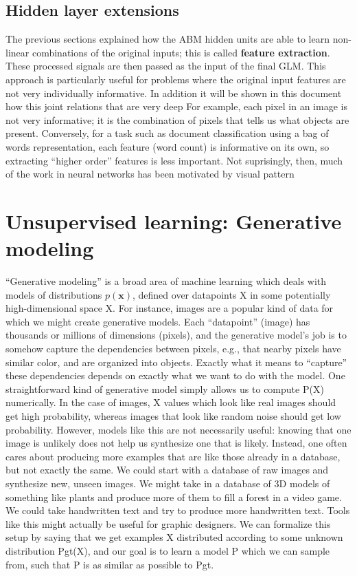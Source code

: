 \subsection{Hidden layer extensions}

The previous sections explained how the \ac{ABM} hidden units are able to learn non-linear combinations of the original inputs; this is called \textbf{feature extraction}. These processed signals are then passed as the input of the final \ac{GLM}. This approach is particularly useful for problems where the original input features are not very individually informative. 
In addition it will be shown in this document how this joint relations that are very deep 
For example, each pixel in an image is not very
informative; it is the combination of pixels that tells us what objects are present. Conversely, for
a task such as document classification using a bag of words representation, each feature (word
count) is informative on its own, so extracting “higher order” features is less important. Not
suprisingly, then, much of the work in neural networks has been motivated by visual pattern




\section{Unsupervised learning: Generative modeling}
“Generative modeling” is a broad area of machine learning which deals with models of distributions $p(\bm{x})$, defined over datapoints X in some potentially high-dimensional space X. For instance, images are a popular kind of data for which we might create generative models. Each “datapoint” (image) has thousands or millions of dimensions (pixels), and the generative model’s job is to somehow capture the dependencies between pixels, e.g., that nearby
pixels have similar color, and are organized into objects. Exactly what it means to “capture” these dependencies depends on exactly what we want to do with the model. One straightforward kind of generative model simply allows us to compute P(X) numerically. In the case of images, X values  which look like real images should get high probability, whereas images that look like random noise should get low probability. However, models like this are not necessarily useful: knowing that one image is unlikely does not help us synthesize one that is likely. Instead, one often cares about producing more examples that are like those already in a database, but not exactly the same. We could start with a database of raw images and synthesize new, unseen images. We might take in a database of 3D models of something like plants and produce more of them to fill a forest in a video game. We could take handwritten text and try to produce more handwritten text. Tools like this might actually be useful for graphic designers. We can formalize this setup by saying that we get examples X distributed according to some unknown distribution Pgt(X), and our goal is to learn a model P which we can sample from, such that P is as similar as possible to Pgt.



